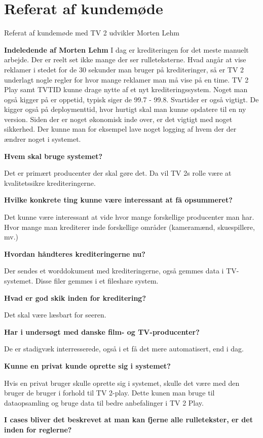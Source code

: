\section{Referat af kundemøde}
Referat af kundemøde med TV 2 udvikler Morten Lehm 

\textbf{Indeledende af Morten Lehm}
I dag er krediteringen for det meste manuelt arbejde. Der er reelt set ikke mange der ser rulleteksterne. Hvad angår at vise reklamer i stedet for de 30 sekunder man bruger på krediteringer, så er TV 2 underlagt nogle regler for hvor mange reklamer man må vise på en time. TV 2 Play samt TVTID kunne drage nytte af et nyt krediteringssystem. Noget man også kigger på er oppetid, typisk siger de 99.7 - 99.8. Svartider er også vigtigt. De kigger også på deploymenttid, hvor hurtigt skal man kunne opdatere til en ny version. Siden der er noget økonomisk inde over, er det vigtigt med noget sikkerhed. Der kunne man for eksempel lave noget logging af hvem der der ændrer noget i systemet.

\textbf{Hvem skal bruge systemet?}

Det er primært producenter der skal gøre det. Da vil TV 2s rolle være at kvalitetssikre krediteringerne.

\textbf{Hvilke konkrete ting kunne være interessant at få opsummeret?}

Det kunne være interessant at vide hvor mange forskellige producenter man har. Hvor mange man krediterer inde forskellige områder (kameramænd, skuespillere, mv.)

\textbf{Hvordan håndteres krediteringerne nu?}

Der sendes et worddokument med krediteringerne, også gemmes data i TV-systemet. Disse filer gemmes i et fileshare system.

\textbf{Hvad er god skik inden for kreditering?}

Det skal være læsbart for seeren.

\textbf{Har i undersøgt med danske film- og TV-producenter?}

De er stadigvæk interresserede, også i et få det mere automatisert, end i dag.

\textbf{Kunne en privat kunde oprette sig i systemet?}

Hvis en privat bruger skulle oprette sig i systemet, skulle det være med den bruger de bruger i forhold til TV 2-play. Dette kunen man bruge til dataopsamling og bruge data til bedre anbefalinger i TV 2 Play.

\textbf{I cases bliver det beskrevet at man kan fjerne alle rulletekster, er det inden for reglerne?}

